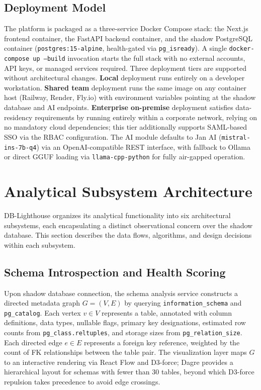 \documentclass[conference]{IEEEtran}
\begin{document}
\subsection{Deployment Model}

The platform is packaged as a three-service Docker Compose stack: the
Next.js frontend container, the FastAPI backend container, and the shadow
PostgreSQL container (\texttt{postgres:15-alpine}, health-gated via
\texttt{pg\_isready}). A single \texttt{docker-compose up --build}
invocation starts the full stack with no external accounts, API keys, or
managed services required. Three deployment tiers are supported without
architectural changes. \textbf{Local} deployment runs entirely on a
developer workstation. \textbf{Shared team} deployment runs the same image
on any container host (Railway, Render, Fly.io) with environment variables
pointing at the shadow database and AI endpoints. \textbf{Enterprise
on-premise} deployment satisfies data-residency requirements by running
entirely within a corporate network, relying on no mandatory cloud
dependencies; this tier additionally supports SAML-based SSO via the RBAC
configuration. The AI module defaults to Jan AI (\texttt{mistral-ins-7b-q4})
via an OpenAI-compatible REST interface, with fallback to Ollama or direct
GGUF loading via \texttt{llama-cpp-python} for fully air-gapped operation.

\section{Analytical Subsystem Architecture}

DB-Lighthouse organizes its analytical functionality into six architectural
subsystems, each encapsulating a distinct observational concern over the
shadow database. This section describes the data flows, algorithms, and
design decisions within each subsystem.

\subsection{Schema Introspection and Health Scoring}

Upon shadow database connection, the schema analysis service constructs a
directed metadata graph $G = (V, E)$ by querying \texttt{information\_schema}
and \texttt{pg\_catalog}. Each vertex $v \in V$ represents a table,
annotated with column definitions, data types, nullable flags, primary key
designations, estimated row counts from \texttt{pg\_class.reltuples}, and
storage sizes from \texttt{pg\_relation\_size}. Each directed edge
$e \in E$ represents a foreign key reference, weighted by the count of FK
relationships between the table pair. The visualization layer maps $G$ to
an interactive rendering via React Flow and D3-force; Dagre provides a
hierarchical layout for schemas with fewer than 30 tables, beyond which
D3-force repulsion takes precedence to avoid edge crossings.
\end{document}
